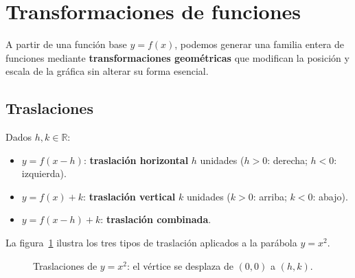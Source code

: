 \section{Transformaciones de funciones}

A partir de una función base $y = f(x)$, podemos generar una familia entera de funciones mediante \textbf{transformaciones geométricas} que modifican la posición y escala de la gráfica sin alterar su forma esencial.

\subsection{Traslaciones}

Dados $h, k \in \mathbb{R}$:
\begin{itemize}
  \item $y = f(x-h)$: \textbf{traslación horizontal} $h$ unidades ($h>0$: derecha; $h<0$: izquierda).
  \item $y = f(x)+k$: \textbf{traslación vertical} $k$ unidades ($k>0$: arriba; $k<0$: abajo).
  \item $y = f(x-h)+k$: \textbf{traslación combinada}.
\end{itemize}

La figura~\ref{fig:traslaciones_parabola} ilustra los tres tipos de
traslación aplicados a la parábola $y = x^2$.

\begin{figure}[!htbp]
\centering
{}
\caption{Traslaciones de $y=x^2$: el vértice se desplaza de $(0,0)$ a $(h,k)$.}
\label{fig:traslaciones_parabola}
\end{figure}

